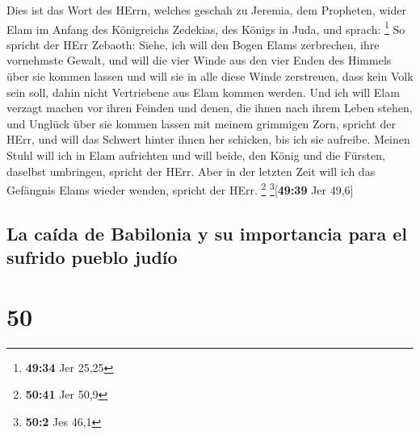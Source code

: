  Dies ist das Wort des HErrn, welches geschah zu Jeremia,
dem Propheten, wider Elam im Anfang des Königreichs Zedekias, des Königs
in Juda, und sprach: \footnote{\textbf{49:34} Jer 25,25} 
So spricht der HErr Zebaoth: Siehe, ich will den Bogen Elams zerbrechen,
ihre vornehmste Gewalt,  und will die vier Winde aus den
vier Enden des Himmels über sie kommen lassen und will sie in alle diese
Winde zerstreuen, dass kein Volk sein soll, dahin nicht Vertriebene aus
Elam kommen werden.  Und ich will Elam verzagt machen vor
ihren Feinden und denen, die ihnen nach ihrem Leben stehen, und Unglück
über sie kommen lassen mit meinem grimmigen Zorn, spricht der HErr, und
will das Schwert hinter ihnen her schicken, bis ich sie aufreibe.
 Meinen Stuhl will ich in Elam aufrichten und will beide,
den König und die Fürsten, daselbst umbringen, spricht der HErr.
 Aber in der letzten Zeit will ich das Gefängnis Elams
wieder wenden, spricht der HErr. \footnote{\textbf{50:41} Jer 50,9}
\footnote{\textbf{50:2} Jes 46,1}{[}\textbf{49:39} Jer 49,6{]}

\hypertarget{la-cauxedda-de-babilonia-y-su-importancia-para-el-sufrido-pueblo-juduxedo}{%
\subsection{La caída de Babilonia y su importancia para el sufrido
pueblo
judío}\label{la-cauxedda-de-babilonia-y-su-importancia-para-el-sufrido-pueblo-juduxedo}}

\hypertarget{section-49}{%
\section{50}\label{section-49}}

